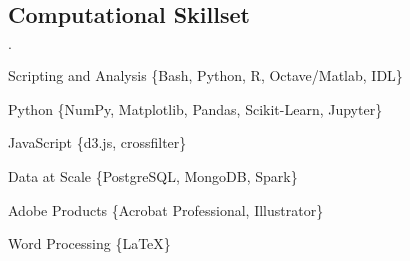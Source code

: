 \documentclass[margin,line]{res}
\newenvironment{list2}{
  \begin{list}{$\cdot$}{%
      \setlength{\itemsep}{0in}
      \setlength{\parsep}{0in} \setlength{\parskip}{0in}
      \setlength{\topsep}{0in} \setlength{\partopsep}{0in} 
      \setlength{\leftmargin}{0.2in}}}{\end{list}}
\newenvironment{list3}{
  \begin{list}{$\cdot$}{%
      \setlength{\itemsep}{0in}
      \setlength{\parsep}{0in} \setlength{\parskip}{0in}
      \setlength{\topsep}{0in} \setlength{\partopsep}{0in} 
      \setlength{\leftmargin}{0.1in}}}{\end{list}}
\begin{document}
\begin{resume}



\section{\sc Computational Skillset}

\begin{list3}
\item Scripting and Analysis \{Bash, Python, R, Octave/Matlab, IDL\}
\item Python \{NumPy, Matplotlib, Pandas, Scikit-Learn, Jupyter\}
\item JavaScript \{d3.js, crossfilter\}
\item Data at Scale \{PostgreSQL, MongoDB, Spark\}
\item Adobe Products \{Acrobat Professional, Illustrator\}
\item Word Processing \{\LaTeX\}
\end{list3}


% 
% 
% 



\end{resume}
\end{document}
